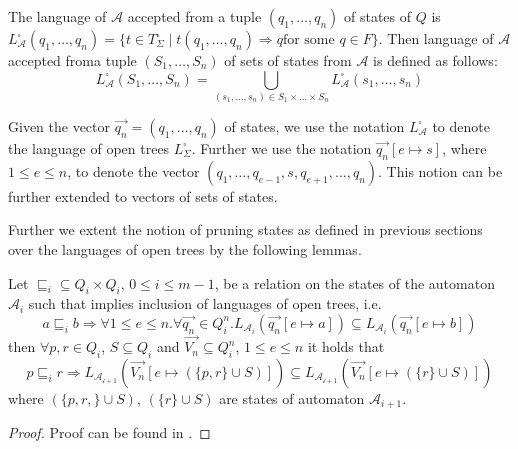 The language of $\mathcal{A}$ accepted from a tuple $(q_1,\ldots,q_n)$ of states
of $Q$ is $L^\square_\mathcal{A}(q_1,\ldots,q_n) = \{t \in T^\square_\Sigma
\mid t(q_1,\ldots,q_n) \Longrightarrow q \text{for some } q \in F\}$. Then
language of $\mathcal{A}$ accepted froma tuple $(S_1,\ldots,S_n)$ of sets of
states from $\mathcal{A}$ is defined as
follows:
\begin{equation}
L_\mathcal{A}^\square(S_1,\ldots,S_n) = \bigcup_{(s_1,\ldots,s_n) \in
S_1\times\ldots\times S_n} L_\mathcal{A}^\square(s_1,\ldots,s_n)
\end{equation}

Given the vector $\overset{\rightarrow}{q_n} = (q_1,\ldots,q_n)$ of states, we
use the notation $L_\mathcal{A}^\square$ to denote the language of open trees
$L_\Sigma^\square$. Further we use the notation $\overset{\rightarrow}{q_n}[e
\mapsto s]$, where $1 \leq e \leq n$, to denote the vector
$(q_1,\ldots,q_{e-1}, s, q_{e+1},\ldots,q_n)$. This notion can be further
extended to vectors of sets of states.

Further we extent the notion of pruning states as defined in previous sections
over the languages of open trees by the following lemmas.

\begin{lemma}
Let $\sqsubseteq_i \subseteq Q_i \times Q_i$, $0 \leq i \leq m-1$, be a relation
on the states of the automaton $\mathcal{A}_i$ such that implies inclusion of
languages of open trees, i.e.
\begin{equation}
 a \sqsubseteq_i b \Rightarrow \forall 1 \leq e \leq n. \forall
 \overset{\rightarrow}{q_n} \in Q_i^n.
 L_{\mathcal{A}_i}(\overset{\rightarrow}{q_n}[e \mapsto a]) \subseteq
 L_{\mathcal{A}_i}(\overset{\rightarrow}{q_n}[e \mapsto b])
\end{equation}
then $\forall p, r \in Q_i$, $S \subseteq Q_i$ and $\overset{\rightarrow}{V_n}
\subseteq Q^n_i$, $1 \leq e \leq n$ it holds that
\begin{equation}
 p \sqsubseteq_i r \Rightarrow
 L_{\mathcal{A_{i+1}}}(\overset{\rightarrow}{V_n}[e \mapsto (\{p, r\} \cup S)])
 \subseteq  L_{\mathcal{A_{i+1}}}(\overset{\rightarrow}{V_n}[e \mapsto (\{r\}
 \cup S)])
\end{equation}
where $(\{p, r,\} \cup S)$, $(\{r\} \cup S)$ are states of automaton
$\mathcal{A}_{i+1}$.
\end{lemma}

\begin{proof}
Proof can be found in \cite{tacas}.
\end{proof}

